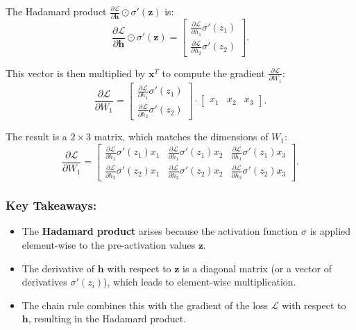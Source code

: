 \begin{notechapter}
The Hadamard product \( \frac{\partial \mathcal{L}}{\partial \mathbf{h}} \odot \sigma'(\mathbf{z}) \) is:
\[
\frac{\partial \mathcal{L}}{\partial \mathbf{h}} \odot \sigma'(\mathbf{z}) = \begin{bmatrix} \frac{\partial \mathcal{L}}{\partial h_1} \sigma'(z_1) \\ \frac{\partial \mathcal{L}}{\partial h_2} \sigma'(z_2) \end{bmatrix}.
\]

This vector is then multiplied by \( \mathbf{x}^T \) to compute the gradient \( \frac{\partial \mathcal{L}}{\partial W_1} \):
\[
\frac{\partial \mathcal{L}}{\partial W_1} = \begin{bmatrix} \frac{\partial \mathcal{L}}{\partial h_1} \sigma'(z_1) \\ \frac{\partial \mathcal{L}}{\partial h_2} \sigma'(z_2) \end{bmatrix} \cdot \begin{bmatrix} x_1 & x_2 & x_3 \end{bmatrix}.
\]

The result is a \( 2 \times 3 \) matrix, which matches the dimensions of \( W_1 \):
\[
\frac{\partial \mathcal{L}}{\partial W_1} = \begin{bmatrix}
\frac{\partial \mathcal{L}}{\partial h_1} \sigma'(z_1) x_1 & \frac{\partial \mathcal{L}}{\partial h_1} \sigma'(z_1) x_2 & \frac{\partial \mathcal{L}}{\partial h_1} \sigma'(z_1) x_3 \\
\frac{\partial \mathcal{L}}{\partial h_2} \sigma'(z_2) x_1 & \frac{\partial \mathcal{L}}{\partial h_2} \sigma'(z_2) x_2 & \frac{\partial \mathcal{L}}{\partial h_2} \sigma'(z_2) x_3
\end{bmatrix}.
\]

\subsubsection{Key Takeaways:}
\begin{itemize}
    \item The \textbf{Hadamard product} arises because the activation function \( \sigma \) is applied element-wise to the pre-activation values \( \mathbf{z} \).
    \item The derivative of \( \mathbf{h} \) with respect to \( \mathbf{z} \) is a diagonal matrix (or a vector of derivatives \( \sigma'(z_i) \)), which leads to element-wise multiplication.
    \item The chain rule combines this with the gradient of the loss \( \mathcal{L} \) with respect to \( \mathbf{h} \), resulting in the Hadamard product.
\end{itemize}


\end{notechapter}
